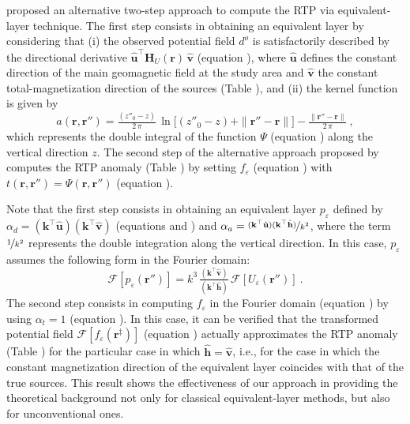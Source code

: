 \citet{guspi_novara2009} proposed an alternative two-step approach to compute the RTP via equivalent-layer technique. 
The first step consists in obtaining an equivalent layer by considering that (i) the observed potential field $d^{o}$
is satisfactorily described by the directional derivative 
$\hat{\mathbf{u}}^{\top} \mathbf{H}_{U}(\mathbf{r}) \, \hat{\mathbf{v}}$ 
(equation ), where $\hat{\mathbf{u}}$ defines the constant direction of the main geomagnetic
field at the study area and $\hat{\mathbf{v}}$ the constant total-magnetization direction of the sources  (Table ), and (ii)
the kernel function is given by 
\begin{equation}
	a(\mathbf{r}, \mathbf{r}'') = \tfrac{\left( z''_{0} - z \right)}{2 \, \pi} \, 
	\ln{\Big[} \left( z''_{0} - z \right) + \| \mathbf{r}'' - \mathbf{r} \| {\Big]} - 
	\tfrac{\| \mathbf{r}'' - \mathbf{r} \|}{2 \, \pi} \: ,
	\label{eq:kernel-Fourier-Guspi}
\end{equation}
which represents the double integral of the function $\Psi$ (equation ) 
along the vertical direction $z$.
The second step of the alternative approach proposed by \citet{guspi_novara2009} computes the RTP anomaly 
(Table ) by setting $f_{\varepsilon}$ (equation ) with 
$t(\mathbf{r}, \mathbf{r}'') = \Psi(\mathbf{r}, \mathbf{r}'')$ (equation ).

Note that the first step consists in obtaining an equivalent layer $p_{\varepsilon}$ defined by 
$\alpha_{d} = (\mathbf{k}^{\top} \hat{\mathbf{u}}) (\mathbf{k}^{\top} \hat{\mathbf{v}})$ (equations  
and ) and 
$\alpha_{a} = \nicefrac{(\mathbf{k}^{\top} \hat{\mathbf{u}}) (\mathbf{k}^{\top} \hat{\mathbf{h}})}{k^{2}}$, 
where the term $\nicefrac{1}{k^{2}}$ represents the double integration along the vertical direction. In this case,  
$p_{\varepsilon}$ assumes the following form in the Fourier domain:
\begin{equation}
	\mathcal{F} [ p_{\varepsilon}(\mathbf{r}'') ] =
	k^{3} \, \tfrac{\left(\mathbf{k}^{\top} \hat{\mathbf{v}} \right)}{\left(\mathbf{k}^{\top} \hat{\mathbf{h}} \right)} \,
	\mathcal{F} \left[ U_{\varepsilon}(\mathbf{r}'') \right] \: .
	\label{eq:p-Fourier-guspi}
\end{equation}
The second step consists in computing $f_{\varepsilon}$ in the Fourier domain (equation ) 
by using $\alpha_{t} = 1$ (equation ).
In this case, it can be verified that the transformed potential field $\mathcal{F} [ f_{\varepsilon}(\mathbf{r}^{\ddagger}) ]$ 
(equation ) actually approximates the RTP anomaly  (Table ) 
for the particular case in which $\hat{\mathbf{h}} = \hat{\mathbf{v}}$, 
i.e., for the case in which the constant magnetization direction of the equivalent layer coincides with that of the true sources.
This result shows the effectiveness of our approach in providing the theoretical background not only for classical 
equivalent-layer methods, but also for unconventional ones.